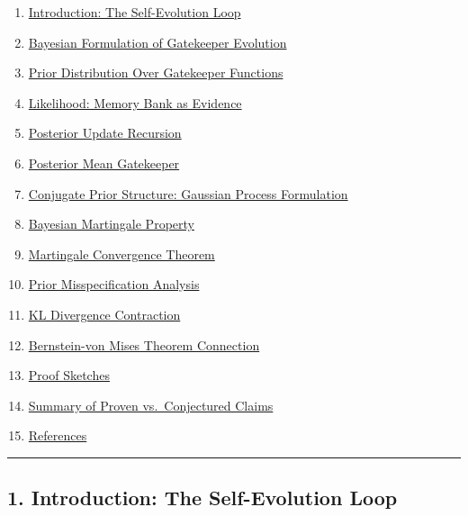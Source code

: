 \documentclass[
  12pt,
]{article}
\providecommand{\tightlist}{%
  \setlength{\itemsep}{0pt}\setlength{\parskip}{0pt}}
\begin{document}
\begin{enumerate}
\def\labelenumi{\arabic{enumi}.}
\tightlist
\item
  \hyperref[1-introduction-the-self-evolution-loop]{Introduction: The
  Self-Evolution Loop}
\item
  \hyperref[2-bayesian-formulation-of-gatekeeper-evolution]{Bayesian
  Formulation of Gatekeeper Evolution}
\item
  \hyperref[3-prior-distribution-over-gatekeeper-functions]{Prior
  Distribution Over Gatekeeper Functions}
\item
  \hyperref[4-likelihood-memory-bank-as-evidence]{Likelihood: Memory
  Bank as Evidence}
\item
  \hyperref[5-posterior-update-recursion]{Posterior Update Recursion}
\item
  \hyperref[6-posterior-mean-gatekeeper]{Posterior Mean Gatekeeper}
\item
  \hyperref[7-conjugate-prior-structure-gaussian-process-formulation]{Conjugate
  Prior Structure: Gaussian Process Formulation}
\item
  \hyperref[8-bayesian-martingale-property]{Bayesian Martingale
  Property}
\item
  \hyperref[9-martingale-convergence-theorem]{Martingale Convergence
  Theorem}
\item
  \hyperref[10-prior-misspecification-analysis]{Prior Misspecification
  Analysis}
\item
  \hyperref[11-kl-divergence-contraction]{KL Divergence Contraction}
\item
  \hyperref[12-bernstein-von-mises-theorem-connection]{Bernstein-von
  Mises Theorem Connection}
\item
  \hyperref[13-proof-sketches]{Proof Sketches}
\item
  \hyperref[14-summary-of-proven-vs-conjectured-claims]{Summary of
  Proven vs.~Conjectured Claims}
\item
  \hyperref[15-references]{References}
\end{enumerate}

\begin{center}\rule{0.5\linewidth}{0.5pt}\end{center}

\subsection{1. Introduction: The Self-Evolution
Loop}\label{introduction-the-self-evolution-loop}
\end{document}
